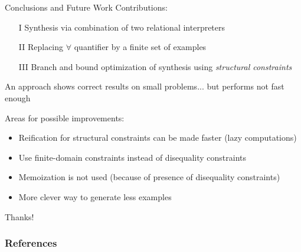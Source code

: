 \documentclass[aspectratio=169
  , xcolor={svgnames}
  , hyperref={ colorlinks,citecolor=Blue
             , linkcolor=DarkRed,urlcolor=DarkBlue}
  , russian
  ]{beamer}
\newcommand{\contributions}{
\begin{enumerate}
\item[I] Synthesis via combination of two relational interpreters
\item[II] Replacing $\forall$ quantifier by a finite set of examples
\item[III] Branch and bound optimization of synthesis using \emph{structural constraints}
\end{enumerate}
}
\begin{document}
\begin{frame}{Conclusions and Future Work}
Contributions: \contributions
\vspace{1em}

An approach shows correct results on small problems...
 but performs not fast enough\\
\vspace{1em}
 
Areas for possible improvements:
\begin{itemize}
\item Reification for structural constraints can be made faster (lazy computations)
\item Use finite-domain constraints instead of disequality constraints 
\item Memoization is not used (because of presence of disequality constraints)
\item More clever way to generate less examples
\end{itemize}
\vspace{1em}\pause
\begin{center}
{\Huge Thanks!}
\end{center}
\end{frame}

\begin{frame}%
\frametitle{References}


\vspace{1cm}
\end{frame}
\end{document}
